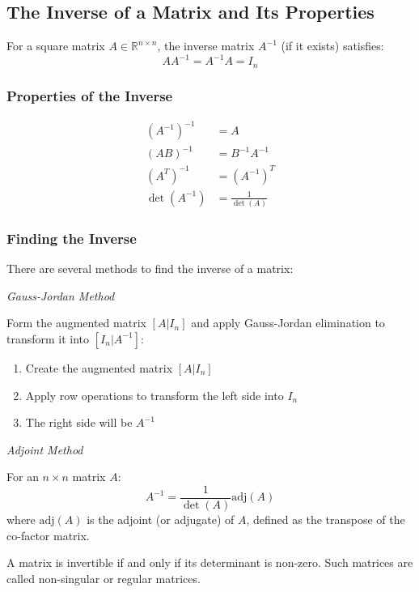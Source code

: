 \subsection{The Inverse of a Matrix and Its Properties}

For a square matrix \(A \in \mathbb{R}^{n \times n}\), the inverse matrix \(A^{-1}\) (if it exists) satisfies:
\begin{equation*}
A A^{-1} = A^{-1} A = I_n
\end{equation*}

\subsubsection{Properties of the Inverse}
\begin{align*}
{(A^{-1})}^{-1} &= A \\
{(AB)}^{-1} &= B^{-1}A^{-1} \\
{(A^T)}^{-1} &= {(A^{-1})}^T \\
\det(A^{-1}) &= \frac{1}{\det(A)}
\end{align*}

\subsubsection{Finding the Inverse}
There are several methods to find the inverse of a matrix:

\emph{Gauss-Jordan Method} 

Form the augmented matrix \([A|I_n]\) and apply Gauss-Jordan elimination to transform it into \([I_n|A^{-1}]\):
\begin{enumerate}
    \item Create the augmented matrix \([A|I_n]\)
    \item Apply row operations to transform the left side into \(I_n\)
    \item The right side will be \(A^{-1}\)
\end{enumerate}

\emph{Adjoint Method}

For an \(n \times n\) matrix \(A\):
\begin{equation*}
A^{-1} = \frac{1}{\det(A)} \text{adj}(A)
\end{equation*}
where \(\text{adj}(A)\) is the adjoint (or adjugate) of \(A\), defined as the transpose of the co-factor matrix.

A matrix is invertible if and only if its determinant is non-zero. Such matrices are called non-singular or regular matrices.

